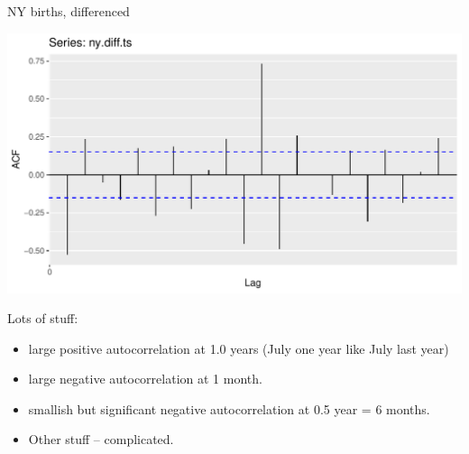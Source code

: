 \documentclass[ignorenonframetext,]{beamer}
\newenvironment{Shaded}{\begin{snugshade}}{\end{snugshade}}
\newcommand{\DataTypeTok}[1]{\textcolor[rgb]{0.13,0.29,0.53}{#1}}
\newcommand{\KeywordTok}[1]{\textcolor[rgb]{0.13,0.29,0.53}{\textbf{#1}}}
\newcommand{\NormalTok}[1]{#1}
\newcommand{\OperatorTok}[1]{\textcolor[rgb]{0.81,0.36,0.00}{\textbf{#1}}}
\newcommand{\StringTok}[1]{\textcolor[rgb]{0.31,0.60,0.02}{#1}}
\providecommand{\tightlist}{%
  \setlength{\itemsep}{0pt}\setlength{\parskip}{0pt}}
\begin{document}
\begin{frame}[fragile]{NY births, differenced}
\protect\hypertarget{ny-births-differenced}{}

\begin{Shaded}
\end{Shaded}

\includegraphics{figure/unnamed-chunk-536-1.pdf}

\end{frame}

\begin{frame}{Lots of stuff:}
\protect\hypertarget{lots-of-stuff}{}

\begin{itemize}
\tightlist
\item
  large positive autocorrelation at 1.0 years (July one year like July
  last year)
\item
  large negative autocorrelation at 1 month.
\item
  smallish but significant negative autocorrelation at 0.5 year = 6
  months.
\item
  Other stuff -- complicated.
\end{itemize}

\end{frame}
\end{document}
